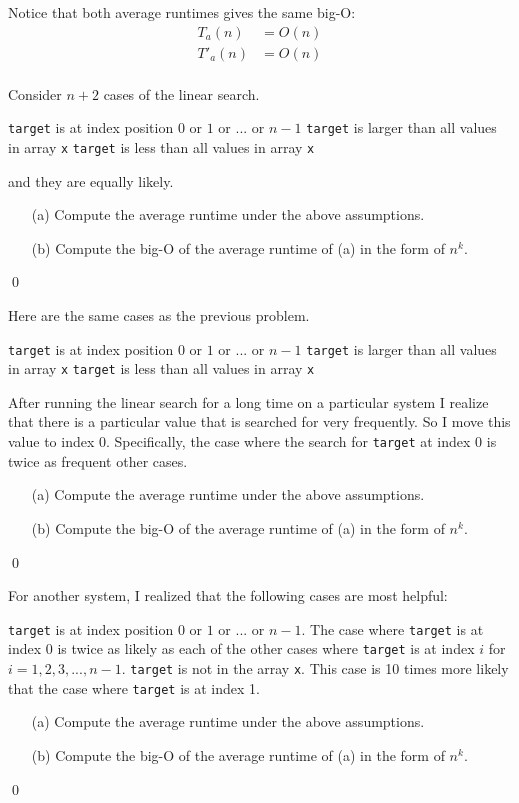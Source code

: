 Notice that both average runtimes gives the same big-O:
\begin{align*}
T_a(n) &= O(n) \\ 
T'_a(n) &= O(n) \\ 
\end{align*}

\begin{ex}
Consider $n + 2$ cases of the linear search.
\begin{itemize}
\li \verb!target! is at index position $0$ or $1$ or ... or $n - 1$
\li \verb!target! is larger than all values in array \verb!x!
\li \verb!target! is less than all values in array \verb!x!
\end{itemize}
and they are equally likely.
\begin{itemize}
\item[(a)] Compute the average runtime under the above assumptions.
\item[(b)] Compute the big-O of the average runtime of (a) in the form of
$n^k$.
\end{itemize}
\qed
\end{ex}

\begin{ex}
Here are the same cases as the previous problem.
\begin{itemize}
\li \verb!target! is at index position $0$ or $1$ or ... or $n - 1$
\li \verb!target! is larger than all values in array \verb!x!
\li \verb!target! is less than all values in array \verb!x!
\end{itemize}
After running the linear search for a long time on a particular
system
I realize that there is
a particular value that is searched for very frequently.
So I move this value to index 0.
Specifically, the case where the search for \verb!target! at index 0
is twice as frequent other cases.
\begin{itemize}
\item[(a)] Compute the average runtime under the above assumptions.
\item[(b)] Compute the big-O of the average runtime of (a) in the form 
of $n^k$.
\end{itemize}
\qed
\end{ex}

\begin{ex}
For another system, I realized that the following cases are most
helpful:
\begin{itemize}
\li \verb!target! is at index position $0$ or $1$ or ... or $n - 1$.
The case where \verb!target! is at index 0 is twice as likely
as each of the other cases where \verb!target! is at index $i$
for $i = 1, 2, 3, ..., n - 1$.
\li \verb!target! is not in the array \verb!x!.
This case is 10 times more likely that the case
where \verb!target! is at index 1.
\end{itemize}
\begin{itemize}
\item[(a)] Compute the average runtime under the above assumptions.
\item[(b)] Compute the big-O of the average runtime of (a) in the form 
of $n^k$.
\end{itemize}
\qed
\end{ex}
